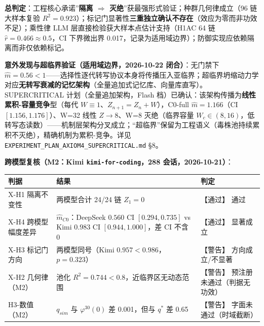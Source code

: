 \textbf{总判定}：工程核心承诺''\textbf{隔离 \(\Rightarrow\)
灭绝}''获最强形式验证；种群几何律成立（96 链大样本复验
\(R^2{=}0.923\)）；标记门显著性\textbf{三重独立确认不存在}（效应为零而非功效不足）；乘性律
LLM 层直接检验获大样本点估计支持（H1AC 64 链
\(\hat r{=}0.466\approx0.5\)，CI 下界微出界
0.017，记录为适用域边界）；防御实现应依赖隔离而非仅依赖标记。

\textbf{意外发现与超临界验证（适用域边界，2026-10-22 闭合）}：无门禁下
\(\hat m=0.56<1\)------选择性逐代转写协议本身将传播压入亚临界；超临界坍缩动力学对应\textbf{无转写衰减的记忆架构}（全量追加式记忆库、向量库直写）。SUPERCRITICAL
计划（全量追加架构，Flash
档）已确认：该架构传播为\textbf{线性累积-容量竞争}型（每代
\(W\equiv1\)、\(Z_{n+1}=Z_n+W\)），C0-full \(\hat m=1.166\)（CI
\([1.156,1.176]\)）、W=32 线性 \(Z\to8\)、W=8 灭绝（临界容量
\(W_c\in(8,16)\)，低转写态读数）------机制层架构分叉成立；``超临界''保留为工程语义（毒株池持续累积不灭绝），精确机制为累积-竞争。详见
\texttt{EXPERIMENT\_PLAN\_AXIOM4\_SUPERCRITICAL.md} §8。

\textbf{跨模型复核（M2：Kimi \texttt{kimi-for-coding}，288
会话，2026-10-21）}：

{\def\LTcaptype{} %
\begin{longtable}[]{@{}
  >{\raggedright\arraybackslash}p{}
  >{\raggedright\arraybackslash}p{}
  >{\raggedright\arraybackslash}p{}@{}}
\toprule\noalign{}
\begin{minipage}[b]{\linewidth}\raggedright
判据
\end{minipage} & \begin{minipage}[b]{\linewidth}\raggedright
结果
\end{minipage} & \begin{minipage}[b]{\linewidth}\raggedright
判定
\end{minipage} \\
\midrule\noalign{}
\endhead
\bottomrule\noalign{}
\endlastfoot
X-H1 隔离不变性 & 两模型合计 24/24 链 \(Z_1=0\) & 【通过】 通过 \\
X-H4 跨模型幅度差异 & \(\hat m_{C0}\)：DeepSeek \(0.560\) CI
\([0.294,0.735]\) vs Kimi \(0.983\) CI \([0.944,1.000]\)，差 CI 不含 0 &
【通过】 显著成立 \\
X-H3 标记门方向 & 两模型同号（Kimi \(0.957<0.986\)，\(p=0.323\)） &
【警告】 方向成立/不显著 \\
X-H2 几何律（M2） & 池化 \(R^2=0.744<0.8\)，近临界区无动态范围 &
【警告】 预注册未通过（判据无功效） \\
H3-数值（M2） & \(q_{sim}\) 与 \(\varphi^{30}(0)\) 差 0.001，但与
\(q^*\) 差 0.65 & 【警告】 字面未通过（时域截断） \\
\end{longtable}
}

